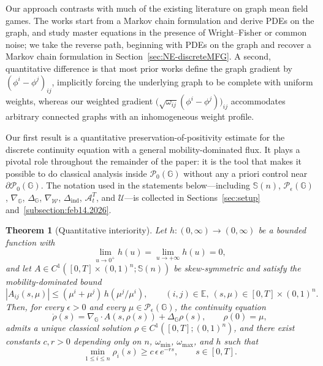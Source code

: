 \documentclass[10pt]{article}
\newtheorem{theorem}{Theorem}[section]
\numberwithin{equation}{section}
\newcommand{\cA}{ \mathcal{A}}
\newcommand{\cP}{ \mathcal{P}}
\newcommand{\cU}{ \mathcal{U}}
\newcommand{\cW}{ \mathcal{W}}
\newcommand{\bE}{\mathbb E}
\newcommand{\bG}{\mathbb G}
\newcommand{\bS}{\mathbb S}
\def\G{\mathbb{G}}
\begin{document}
Our approach contrasts with much of the existing literature on graph mean field games. The works \cite{CecchinP,Delarue2020,GMSouza} start from a Markov chain formulation and derive PDEs on the graph, and \cite{BayraktarC,BayraktarC2,BertucciC} study master equations in the presence of Wright--Fisher or common noise; we take the reverse path, beginning with PDEs on the graph and recover a Markov chain formulation in Section~\ref{sec:NE-discreteMFG}. A second, quantitative difference is that most prior works define the graph gradient by $(\phi^i-\phi^j)_{ij}$, implicitly forcing the underlying graph to be complete with uniform weights, whereas our weighted gradient $\big(\sqrt{\omega_{ij}}(\phi^i-\phi^j)\big)_{ij}$ accommodates arbitrary connected graphs with an inhomogeneous weight profile.

Our first result is a quantitative preservation-of-positivity estimate for the discrete continuity equation with a general mobility-dominated flux. It plays a pivotal role throughout the remainder of the paper: it is the tool that makes it possible to do classical analysis inside $\cP_0(\G)$ without any a priori control near $\partial\cP_0(\G)$. The notation used in the statements below---including $\bS(n)$, $\cP_\epsilon(\G)$, $\nabla_\G$, $\Delta_\G$, $\nabla_\cW$, $\Delta_{\text{ind}}$, $\cA_t^T$, and $\cU$---is collected in Sections~\ref{sec:setup} and~\ref{subsection:feb14.2026}.

\begin{theorem}[Quantitative interiority]\label{thm:main-interiority}
Let $h:(0,\infty)\to(0,\infty)$ be a bounded function with
\begin{equation}\label{eq:h properties}
\lim_{u\to 0^+}h(u)=\lim_{u\to +\infty}h(u)=0,
\end{equation}
and let $A\in C^1([0,T]\times(0,1)^n;\bS(n))$ be skew-symmetric and satisfy the mobility-dominated bound
\begin{equation}\label{as:A conti}
|A_{ij}(s,\mu)|\leq (\mu^i+\mu^j)\,h(\mu^j/\mu^i),\qquad (i,j)\in\bE,\ (s,\mu)\in[0,T]\times(0,1)^n.
\end{equation}
Then, for every $\epsilon>0$ and every $\mu\in\cP_\epsilon(\bG)$, the continuity equation
\begin{equation}\label{eq:conti general}
\dot\rho(s)=\nabla_\G\cdot A(s,\rho(s))+\Delta_\G\rho(s),\qquad \rho(0)=\mu,
\end{equation}
admits a unique classical solution $\rho\in C^1([0,T];(0,1)^n)$, and there exist constants $c,r>0$ depending only on $n$, $\omega_{\min}$, $\omega_{\max}$, and $h$ such that
\begin{equation}\label{eq:rho lower bd}
\min_{1\leq i\leq n}\rho_i(s)\geq c\,\epsilon\,e^{-rs},\qquad s\in[0,T].
\end{equation}
\end{theorem}
\end{document}
